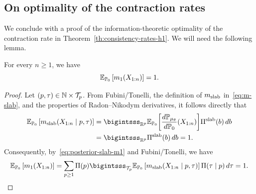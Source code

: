 \subsection{On optimality of the contraction rates}

We conclude with a proof of the information-theoretic optimality of the contraction rate in Theorem~\ref{th:consistency-rates-h1}. We will need the following lemma.

\begin{lemma}\label{lem:expectation-identity} For every \(n\geq 1\), we have 
  \[
    \mathbb{E}_{\mathbb{P}_0}\left[m_1(X_{1:n})\right] = 1.
  \]
\end{lemma}

\begin{proof}
  Let \((p, \tau)\in \mathbb{N} \times \mathcal T_p\). From Fubini/Tonelli, the definition of \(m_{\text{slab}}\) in~\eqref{eq:m-slab}, and the properties of Radon--Nikodym derivatives, it follows directly that
  \begin{align*}
    \E_{\pp_0}\left[\mslab(X_{1:n}\mid p,\tau)\right] &= \bigintsss_{\R^p} \E_{\pp_0}\biggl[\frac{d\pp_{\mu_\theta}}{d\pp_0}(X_{1:n})\biggr]\Pi^{\text{slab}}(b)\, db\\
    &= \bigintsss_{\R^p} \Pi^{\text{slab}}(b)\, db = 1.
  \end{align*}
  Consequently, by~\eqref{eq:posterior-slab-m1} and Fubini/Tonelli, we have
  \[
    \E_{\pp_0}\left[m_1(X_{1:n})\right] = \sum_{p\geq 1} \Pi(p) \bigintsss_{\mathcal T_p} \E_{\pp_0}\left[\mslab(X_{1:n}\mid p,\tau)\right]\Pi(\tau \mid p)\, d\tau = 1.
  \]
\end{proof}

